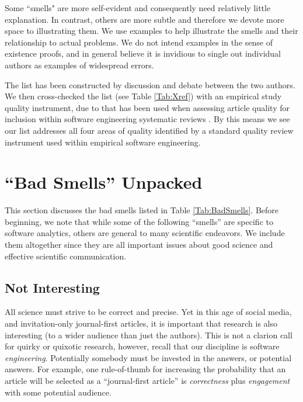 \documentclass[preprint,10pt]{elsarticle}
\begin{document}
Some ``smells" are more self-evident and consequently need relatively little explanation.  In contrast, others are more subtle and therefore we devote more space to illustrating them.  We use examples to help illustrate the smells and their relationship to actual problems.  We do not intend examples in the sense of existence proofs, and in general believe it is invidious to single out individual authors as examples of widespread errors.

The list has been constructed by discussion and debate between the two authors.  We then cross-checked the list (see Table \ref{Tab:Xref}) with an empirical study quality instrument, due to \cite{Dyba08} that has been used when assessing article quality for inclusion within software engineering systematic reviews \cite[chapter 7]{Kitc15}.  By this means we see our list addresses all four areas of quality identified by a standard quality review instrument used within empirical software engineering.  

 
\section{``Bad Smells'' Unpacked}\label{Sec:BadSmells}
This section discusses the bad smells listed in Table \ref{Tab:BadSmells}.
Before beginning, we note that while some of the following ``smells'' are specific to software analytics, others are general to many scientific endeavors.  We include them altogether since they are all important issues about good science and effective scientific communication.


\subsection{Not Interesting}

All science must strive to be correct and precise. Yet in this age of social media, and invitation-only journal-first articles, it is important that research is also interesting (to a wider audience than just the authors).  This is not a clarion call for quirky or quixotic research, however, recall that our discipline is software \textit{engineering}. Potentially somebody must be invested in the answers, or potential answers.  For example, one rule-of-thumb for increasing the probability that an article will be selected as a ``journal-first article'' is {\em correctness} plus {\em engagement} with some potential audience. 


\end{document}
